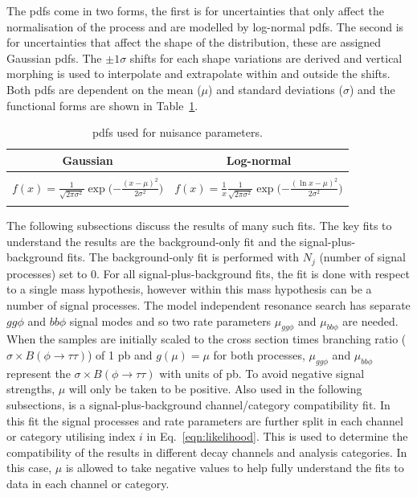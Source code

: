 The pdfs come in two forms, the first is for uncertainties that only affect the normalisation of the process and are modelled by log-normal pdfs. 
The second is for uncertainties that affect the shape of the distribution, these are assigned Gaussian pdfs.
The $\pm1\sigma$ shifts for each shape variations are derived and vertical morphing \cite{Conway:2011in} is used to interpolate and extrapolate within and outside the shifts.
Both pdfs are dependent on the mean ($\mu$) and standard deviations ($\sigma$) and the functional forms are shown in Table~\ref{tab:pdfs}. \\

\begin{table}[!hbtp]
    \centering
    \begin{tabular}{|c|c|}
         \hline
         Gaussian & Log-normal  \\
         \hline
         \hline
          & \\
         $f(x) = \frac{1}{\sqrt{2\pi\sigma^{2}}} \exp\Big({-\frac{(x - \mu)^2}{2\sigma^2}}\Big)$ & $f(x) = \frac{1}{x} \frac{1}{\sqrt{2\pi\sigma^{2}}} \exp\Big({-\frac{(\ln x - \mu)^2}{2\sigma^2}}\Big)$ \\
          & \\
         \hline
    \end{tabular}
    \caption{pdfs used for nuisance parameters.}
    \label{tab:pdfs}
\end{table}

The following subsections discuss the results of many such fits.
The key fits to understand the results are the background-only fit and the signal-plus-background fits.
The background-only fit is performed with $N_j$ (number of signal processes) set to 0.
For all signal-plus-background fits, the fit is done with respect to a single mass hypothesis, however within this mass hypothesis can be a number of signal processes.
The model independent resonance search has separate $gg\phi$ and $bb\phi$ signal modes and so two rate parameters $\mu_{gg\phi}$ and $\mu_{bb\phi}$ are needed.
When the samples are initially scaled to the cross section times branching ratio ($\sigma \times B (\phi\rightarrow\tau\tau)$) of 1 pb and $g(\mu)=\mu$ for both processes, $\mu_{gg\phi}$ and $\mu_{bb\phi}$ represent the $\sigma \times B (\phi\rightarrow\tau\tau)$ with units of pb.
To avoid negative signal strengths, $\mu$ will only be taken to be positive.
Also used in the following subsections, is a signal-plus-background channel/category compatibility fit.
In this fit the signal processes and rate parameters are further split in each channel or category utilising index $i$ in Eq.~\ref{eqn:likelihood}.
This is used to determine the compatibility of the results in different decay channels and analysis categories.
In this case, $\mu$ is allowed to take negative values to help fully understand the fits to data in each channel or category. \\


